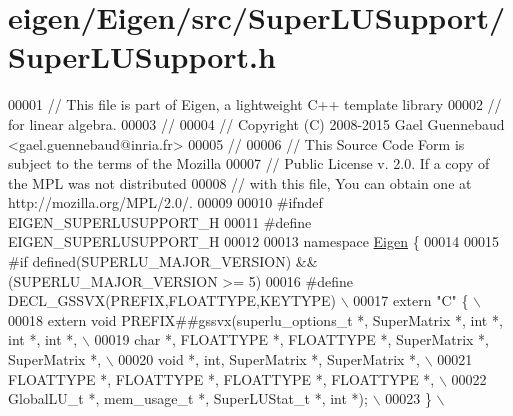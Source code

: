 \hypertarget{eigen_2_eigen_2src_2_super_l_u_support_2_super_l_u_support_8h_source}{}\section{eigen/\+Eigen/src/\+Super\+L\+U\+Support/\+Super\+L\+U\+Support.h}
\label{eigen_2_eigen_2src_2_super_l_u_support_2_super_l_u_support_8h_source}

\begin{DoxyCode}
00001 \textcolor{comment}{// This file is part of Eigen, a lightweight C++ template library}
00002 \textcolor{comment}{// for linear algebra.}
00003 \textcolor{comment}{//}
00004 \textcolor{comment}{// Copyright (C) 2008-2015 Gael Guennebaud <gael.guennebaud@inria.fr>}
00005 \textcolor{comment}{//}
00006 \textcolor{comment}{// This Source Code Form is subject to the terms of the Mozilla}
00007 \textcolor{comment}{// Public License v. 2.0. If a copy of the MPL was not distributed}
00008 \textcolor{comment}{// with this file, You can obtain one at http://mozilla.org/MPL/2.0/.}
00009 
00010 \textcolor{preprocessor}{#ifndef EIGEN\_SUPERLUSUPPORT\_H}
00011 \textcolor{preprocessor}{#define EIGEN\_SUPERLUSUPPORT\_H}
00012 
00013 \textcolor{keyword}{namespace }\hyperlink{namespace_eigen}{Eigen} \{
00014 
00015 \textcolor{preprocessor}{#if defined(SUPERLU\_MAJOR\_VERSION) && (SUPERLU\_MAJOR\_VERSION >= 5)}
00016 \textcolor{preprocessor}{#define DECL\_GSSVX(PREFIX,FLOATTYPE,KEYTYPE)        \(\backslash\)}
00017 \textcolor{preprocessor}{    extern "C" \{                                                                                          \(\backslash\)}
00018 \textcolor{preprocessor}{      extern void PREFIX##gssvx(superlu\_options\_t *, SuperMatrix *, int *, int *, int *,                  \(\backslash\)}
00019 \textcolor{preprocessor}{                                char *, FLOATTYPE *, FLOATTYPE *, SuperMatrix *, SuperMatrix *,           \(\backslash\)}
00020 \textcolor{preprocessor}{                                void *, int, SuperMatrix *, SuperMatrix *,                                \(\backslash\)}
00021 \textcolor{preprocessor}{                                FLOATTYPE *, FLOATTYPE *, FLOATTYPE *, FLOATTYPE *,                       \(\backslash\)}
00022 \textcolor{preprocessor}{                                GlobalLU\_t *, mem\_usage\_t *, SuperLUStat\_t *, int *);                     \(\backslash\)}
00023 \textcolor{preprocessor}{    \}                                                                                                     \(\backslash\)}

\end{DoxyCode}
